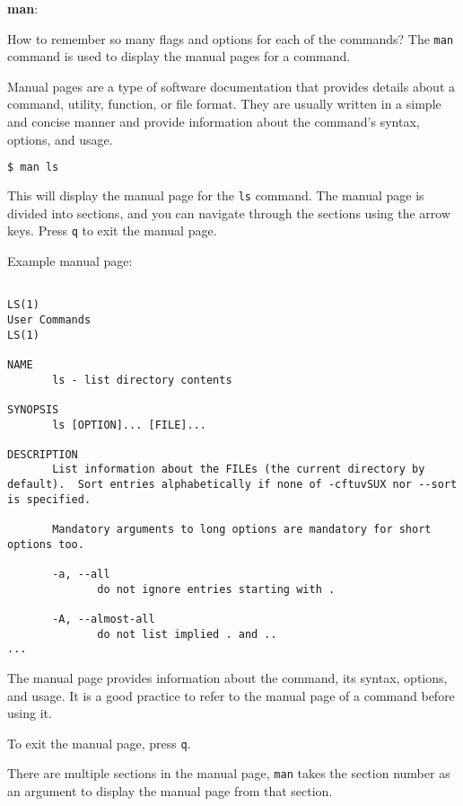 \textbf{man}:

How to remember so many flags and options for each of the commands?
The \lstinline|man| command is used to display the manual pages for a command.

\begin{definition}
  Manual pages are a type of software documentation that provides details about a command, utility, function, or file format. They are usually written in a simple and concise manner and provide information about the command's syntax, options, and usage.
\end{definition}

\begin{lstlisting}[language=bash]
  $ man ls
\end{lstlisting}

This will display the manual page for the \lstinline|ls| command. The manual page is divided into sections, and you can navigate through the sections using the arrow keys. Press \lstinline|q| to exit the manual page.

Example manual page:

\begin{lstlisting}

LS(1)                                                                                User Commands                                                                               LS(1)

NAME
       ls - list directory contents

SYNOPSIS
       ls [OPTION]... [FILE]...

DESCRIPTION
       List information about the FILEs (the current directory by default).  Sort entries alphabetically if none of -cftuvSUX nor --sort is specified.

       Mandatory arguments to long options are mandatory for short options too.

       -a, --all
              do not ignore entries starting with .

       -A, --almost-all
              do not list implied . and ..
...
\end{lstlisting}

The manual page provides information about the command, its syntax, options, and usage.
It is a good practice to refer to the manual page of a command before using it.

To exit the manual page, press \lstinline|q|.

There are multiple sections in the manual page, \lstinline|man| takes the section number as an argument to display the manual page from that section.

